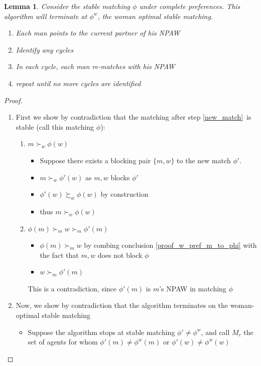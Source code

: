 \documentclass[WP]{AEA}
\newtheorem{lemma}{Lemma}
\begin{document}
\begin{lemma}
	Consider the stable matching $\phi$ under complete preferences. This algorithm will terminate at  $\phi^w$, the woman optimal stable matching.
	\begin{enumerate}
		\item Each man points to the current partner of his NPAW
		\item Identify any cycles
		\item \label{new_match} In each cycle, each man re-matches with his NPAW
		\item repeat until no more cycles are identified
	\end{enumerate}
\end{lemma}
\begin{proof}
	\begin{enumerate}
		\item 	First we show by contradiction that the matching after step \ref{new_match} is stable (call this matching $\phi$):
		\begin{enumerate}
			\item \label{proof_w_pref_m_to_phi} $ m \succ_w \phi(w)$ 
			\begin{itemize}
				\item Suppose there exists a blocking pair $\{m,w\}$ to the new match $\phi '$.
				\item  $ m \succ_w \phi'(w)$ as ${m,w}$ blocks $\phi'$
				\item $ \phi'(w) \succsim_w \phi(w)$ by construction
				\item thus $ m \succ_w \phi(w)$ 
			\end{itemize}
			\item $ \phi(m) \succ_m w \succ_m \phi'(m)$
			\begin{itemize}
				\item $\phi(m) \succ_m w$  by combing   conclusion \ref{proof_w_pref_m_to_phi} with the fact that ${m,w}$ does not block $\phi$ 
				\item $w \succ_m \phi'(m)$
			\end{itemize}
		This is a contradiction, since $\phi'(m)$ is $m$'s NPAW in matching $\phi$
		\end{enumerate}	
		\item Now, we show by contradiction that the algorithm terminates on the woman-optimal stable matching
		\begin{itemize}
			\item Suppose the algorithm stops at stable matching $ \phi ' \neq \phi ^w$, and call $M_c$ the set of agents for whom $ \phi '(m) \neq \phi ^w(m)$ or $\phi'(w) \neq \phi^w(w)$

\end{itemize}
\end{enumerate}
\end{proof}
\end{document}
